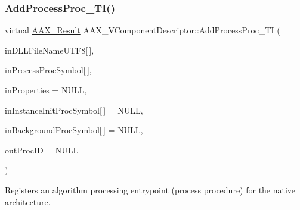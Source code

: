 \subsubsection{\texorpdfstring{AddProcessProc\_TI()}{AddProcessProc\_TI()}}
{\footnotesize\ttfamily virtual \mbox{\hyperlink{a00392_a4d8f69a697df7f70c3a8e9b8ee130d2f}{A\+A\+X\+\_\+\+Result}} A\+A\+X\+\_\+\+V\+Component\+Descriptor\+::\+Add\+Process\+Proc\+\_\+\+TI (\begin{DoxyParamCaption}\item[{const char}]{in\+D\+L\+L\+File\+Name\+U\+T\+F8\mbox{[}$\,$\mbox{]},  }\item[{const char}]{in\+Process\+Proc\+Symbol\mbox{[}$\,$\mbox{]},  }\item[{\mbox{\hyperlink{a01869}{A\+A\+X\+\_\+\+I\+Property\+Map}} $\ast$}]{in\+Properties = {\ttfamily NULL},  }\item[{const char}]{in\+Instance\+Init\+Proc\+Symbol\mbox{[}$\,$\mbox{]} = {\ttfamily NULL},  }\item[{const char}]{in\+Background\+Proc\+Symbol\mbox{[}$\,$\mbox{]} = {\ttfamily NULL},  }\item[{\mbox{\hyperlink{a00392_aeaf9b387f902c50a8360ff423f4a1f23}{A\+A\+X\+\_\+\+C\+Selector}} $\ast$}]{out\+Proc\+ID = {\ttfamily NULL} }\end{DoxyParamCaption})\hspace{0.3cm}{\ttfamily [virtual]}}



Registers an algorithm processing entrypoint (process procedure) for the native architecture. 



